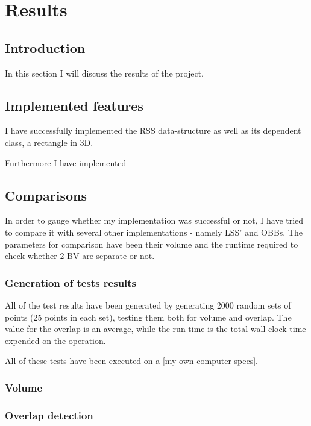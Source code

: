 
\section{Results}
\label{results}
\subsection{Introduction}
In this section I will discuss the results of the project.

\subsection{Implemented features}
I have successfully implemented the RSS data-structure as well as its dependent class, a rectangle in 3D. 

Furthermore I have implemented

\subsection{Comparisons}

In order to gauge whether my implementation was successful or not, I have tried to compare it with several other implementations - namely LSS' and OBBs. The parameters for comparison have been their volume and the runtime required to check whether 2 BV are separate or not.

\subsubsection{Generation of tests results}
All of the test results have been generated by generating 2000 random sets of points (25 points in each set), testing them both for volume and overlap. The value for the overlap is an average, while the run time is the total wall clock time expended on the operation.

All of these tests have been executed on a [my own computer specs].

\subsubsection{Volume}



\subsubsection{Overlap detection}

